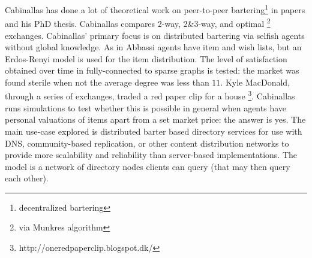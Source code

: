 \documentclass[main.tex]{subfiles}
\begin{document}
Cabinallas \cite{Cab0} \cite{Cab1} has done a lot of theoretical work on peer-to-peer bartering\footnote{decentralized bartering} in papers and his PhD thesis. Cabinallas compares 2-way, 2\&3-way, and optimal \footnote{via Munkres algorithm} exchanges. Cabinallas' primary focus is on distributed bartering via selfish agents without global knowledge. As in Abbassi \cite{Abb1} \cite{Abb2} agents have item and wish lists, but an Erdos-Renyi model is used for the item distribution. The level of satisfaction obtained over time in fully-connected to sparse graphs is tested: the market was found sterile when not the average degree was less than $11$. Kyle MacDonald, through a series of exchanges, traded a red paper clip for a house \footnote{http://oneredpaperclip.blogspot.dk/}. Cabinallas runs simulations to test whether this is possible in general when agents have personal valuations of items apart from a set market price: the answer is yes. The main use-case explored is distributed barter based directory services for use with DNS, community-based replication, or other content distribution networks to provide more scalability and reliability than server-based implementations. The model is a network of directory nodes clients can query (that may then query each other).
\end{document}
